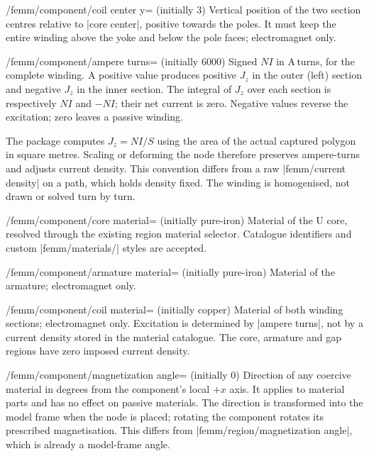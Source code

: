 \begin{key}{/femm/component/coil center y= (initially 3)}
Vertical position of the two section centres relative to |core center|,
positive towards the poles. It must keep the entire winding above the yoke
and below the pole faces; electromagnet only.
\end{key}
\begin{key}{/femm/component/ampere turns= (initially 6000)}
Signed $NI$ in A\,turns, for the complete winding. A positive value produces
positive $J_z$ in the outer (left) section and negative $J_z$ in the inner
section. The integral of $J_z$ over each section is respectively $NI$ and
$-NI$; their net current is zero. Negative values reverse the excitation;
zero leaves a passive winding.

The package computes $J_z=NI/S$ using the area of the actual captured
polygon in square metres. Scaling or deforming the node therefore preserves
ampere-turns and adjusts current density. This convention differs from a raw
|femm/current density| on a path, which holds density fixed.
The winding is homogenised, not drawn or solved turn by turn.
\end{key}
\begin{key}{/femm/component/core material= (initially pure-iron)}
Material of the U core, resolved through the existing region material
selector. Catalogue identifiers and custom |femm/materials/| styles are accepted.
\end{key}
\begin{key}{/femm/component/armature material= (initially pure-iron)}
Material of the armature; electromagnet only.
\end{key}
\begin{key}{/femm/component/coil material= (initially copper)}
Material of both winding sections; electromagnet only. Excitation is determined
by |ampere turns|, not by a current density stored in the material catalogue.
The core, armature and gap regions have zero imposed current density.
\end{key}
\begin{key}{/femm/component/magnetization angle= (initially 0)}
Direction of any coercive material in degrees from the component's local
$+x$ axis. It applies to material parts and has no effect on passive materials.
The direction is transformed into the model frame when the node is placed;
rotating the component rotates its prescribed magnetisation. This differs
from |femm/region/magnetization angle|, which is already a model-frame angle.
\end{key}
